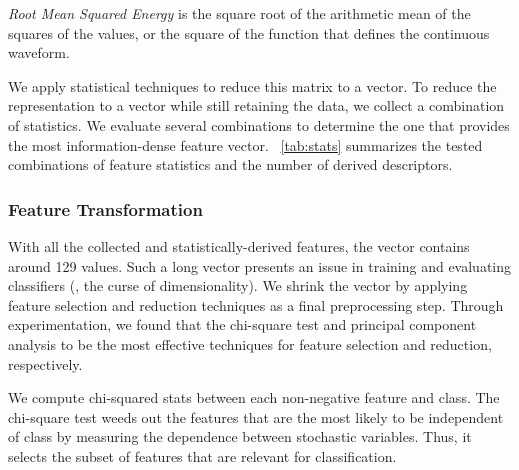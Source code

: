 \item \textit{Root Mean Squared Energy} is the square root of the arithmetic
mean of the squares of the values, or the square of the function that defines the
continuous waveform.

\squishend

We apply statistical techniques to reduce this matrix to a vector. 
%
To reduce the representation to a vector while still retaining the data, we
collect a combination of statistics. 
%
We evaluate several combinations to determine the one that provides the most
information-dense feature vector. 
%
~\cref{tab:stats} summarizes the tested combinations of feature statistics 
and the number of derived descriptors.
%

\subsubsection{Feature Transformation}
\label{sec:representation::transform}

With all the collected and statistically-derived features, the vector contains
around 129 values.
%
Such a long vector presents an issue in training and evaluating classifiers
(\ie, the curse of dimensionality).
%
We shrink the vector by applying feature selection and reduction techniques as 
a final preprocessing step.
%
Through experimentation, we found that the chi-square test and principal
component analysis to be the most effective techniques for feature selection and
reduction, respectively.

%
We compute chi-squared stats between each non-negative feature and class.
% 
The chi-square test weeds out the features that are the most likely to be
independent of class by measuring the dependence between stochastic variables.
%
Thus, it selects the subset of features that are relevant for classification.

